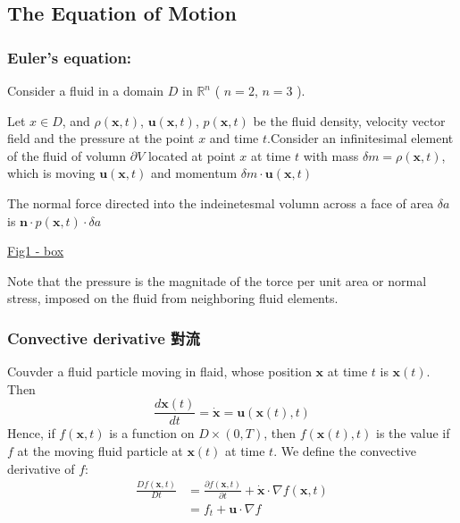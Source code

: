 \subsection{The Equation of Motion} %

\subsubsection{Euler's equation:} %

Consider a fluid in a domain $D$ in $\mathbb{R}^{n}$  ( $n=2$, $n=3$ ).

Let $x\in D$, and $\rho(\textbf{x},t)$, $\textbf{u}(\textbf{x},t)$, $p(\textbf{x},t)$ be the fluid density, velocity vector field and the pressure at the point $x$ and time $t$.Consider an infinitesimal element of the fluid of volumn $\partial V$ located at point $x$ at time $t$ with mass $\delta m = \rho(\textbf{x},t)$, which is moving $\textbf{u}(\textbf{x},t)$ and momentum $\delta m \cdot \textbf{u}(\textbf{x},t)$

The normal force directed into the indeinetesmal volumn across a face of area $\delta a$ is $\textbf{n}\cdot p(\textbf{x},t)\cdot \delta a$

\underline{Fig1 - box}

Note that the pressure is the magnitade of the torce per unit area or normal stress, imposed on the fluid from neighboring fluid elements.

\subsubsection{Convective derivative 對流} %

Couvder a fluid particle moving in flaid, whose position $\textbf{x}$ at time $t$ is $\textbf{x}(t)$. Then 
\begin{equation}
\frac{d\textbf{x}(t)}{dt} = \dot{\textbf{x}} = \textbf{u}(\textbf{x}(t),t)
\end{equation}
Hence, if $f(\textbf{x},t)$ is a function on $D\times (0,T)$, then $f(\textbf{x}(t), t)$ is the value if $f$ at the moving fluid particle at $\textbf{x}(t)$ at time $t$. We define the convective derivative of $f$:
\begin{equation}
\begin{aligned}
\frac{Df(\textbf{x},t)}{Dt} &= \frac{\partial f(\textbf{x},t)}{\partial t} + \dot{\textbf{x}} \cdot \nabla f(\textbf{x},t)\\
&= f_t + \textbf{u}\cdot \nabla f
\end{aligned}
\end{equation}


